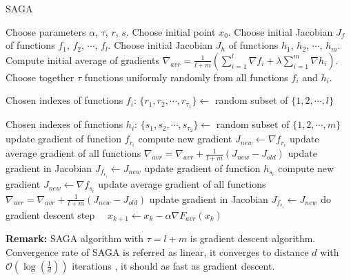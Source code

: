 \documentclass[11pt]{book}
\begin{document}
\begin{algorithm}[H]
	\caption{SAGA \cite{SAGA}}
	\label{alg:saga}
	\begin{algorithmic}[1]
		\State Choose parameters $\alpha$, $\tau$, $r$, $s$.
		\State Choose initial point $x_0$.
		\State Choose initial Jacobian $J_f$ of functions $f_1$, $f_2$, $\cdots$, $f_l$.
		\State Choose initial Jacobian $J_h$ of functions $h_1$, $h_2$, $\cdots$, $h_m$.
		\State Compute initial average of gradients $\nabla_{avr} = \frac{1}{l+m} \left( \sum_{i=1}^l \nabla f_i + \lambda\sum_{i=1}^m \nabla h_i \right)$.
		\State Choose together $\tau$ functions uniformly randomly from all functions $f_i$ and $h_i$.
		
		Chosen indexes of functions $f_i$: $\{r_1, r_2, \cdots, r_{\tau_1} \} \leftarrow$ random subset of $\{1,2,\cdots, l \}$
		
		Chosen indexes of functions $h_i$: $\{s_1, s_2, \cdots, s_{\tau_2} \} \leftarrow$ random subset of $\{1,2,\cdots, m \}$
		 update gradient of function $f_{r_i}$
		\State compute new gradient $J_{new} \leftarrow \nabla f_{r_i}$
		\State update average gradient of all functions $\nabla_{avr}=\nabla_{avr}+\frac{1}{l+m}(J_{new}-J_{old})$
		\State update gradient in Jacobian
		$J_{f_{r_i}} \leftarrow J_{new}$
		\EndFor
		 update gradient of function $h_{s_i}$
		\State compute new gradient $J_{new} \leftarrow \nabla f_{s_i}$
		\State update average gradient of all functions $\nabla_{avr}=\nabla_{avr}+\frac{1}{l+m}(J_{new}-J_{old})$
		\State update gradient in Jacobian
		$J_{f_{s_i}} \leftarrow J_{new}$
		\EndFor
		\State do gradient descent step $\quad x_{k+1} \leftarrow x_k - \alpha\nabla F_{avr}(x_k) \quad$
		\EndFor
	\end{algorithmic}
\end{algorithm}

\textbf{Remark:} SAGA algorithm with $\tau=l+m$ is gradient descent algorithm.\\

Convergence rate of SAGA is referred as linear, it converges to distance $d$ with $\mathcal{O}(\log(\frac{1}{d}))$ iterations \cite{SAGA}, it should as fast as gradient descent.\\
\end{document}
